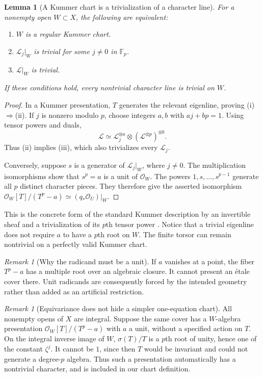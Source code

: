 \documentclass[11pt,a4paper]{article}
\newtheorem{lemma}[theorem]{Lemma}
\theoremstyle{definition}
\theoremstyle{remark}
\newtheorem{remark}[theorem]{Remark}
\newcommand{\F}{\mathbb F}
\newcommand{\OO}{\mathcal O}
\newcommand{\LL}{\mathcal L}
\begin{document}
\begin{lemma}[A Kummer chart is a trivialization of a character line]
\label{ka:lem:kummer}
For a nonempty open $W\subset X$, the following are equivalent:
\begin{enumerate}[label=(\roman*)]
\item $W$ is a regular Kummer chart.
\item $\LL_j|_W$ is trivial for some $j\neq0$ in $\F_p$.
\item $\LL|_W$ is trivial.
\end{enumerate}
If these conditions hold, every nontrivial character line is trivial on
$W$.
\end{lemma}
\begin{proof}
In a Kummer presentation, $T$ generates the relevant eigenline, proving
(i)$\Rightarrow$(ii). If $j$ is nonzero modulo $p$, choose integers $a,b$
with $aj+bp=1$. Using tensor powers and duals,
\[
 \LL\simeq\LL_j^{\otimes a}\otimes
                    (\LL^{\otimes p})^{\otimes b}.
\]
Thus (ii) implies (iii), which also trivializes every $\LL_j$.

Conversely, suppose $s$ is a generator of $\LL_j|_W$, where $j\neq0$.
The multiplication isomorphisms show that $s^p=a$ is a unit of
$\OO_W$. The powers $1,s,\ldots,s^{p-1}$ generate all $p$ distinct
character pieces. They therefore give the asserted isomorphism
$\OO_W[T]/(T^p-a)\simeq(q_*\OO_U)|_W$.
\end{proof}

This is the concrete form of the standard Kummer description by an
invertible sheaf and a trivialization of its $p$th tensor power
\cite{StacksKummer}. Notice that a trivial eigenline does not require
$a$ to have a $p$th root on $W$. The finite torsor can remain nontrivial
on a perfectly valid Kummer chart.

\begin{remark}[Why the radicand must be a unit]
If $a$ vanishes at a point, the fiber $T^p-a$ has a multiple root over an
algebraic closure. It cannot present an \'etale cover there. Unit
radicands are consequently forced by the intended geometry rather than
added as an artificial restriction.
\end{remark}

\begin{remark}[Equivariance does not hide a simpler one-equation chart]
All nonempty opens of $X$ are integral. Suppose the same cover has a
$W$-algebra presentation $\OO_W[T]/(T^p-a)$ with $a$ a unit, without a
specified action on $T$. On the integral inverse image of $W$,
$\sigma(T)/T$ is a $p$th root of unity, hence one of the constant
$\zeta^j$. It cannot be $1$, since then $T$ would be invariant and could
not generate a degree-$p$ algebra. Thus such a presentation automatically
has a nontrivial character, and is included in our chart definition.
\end{remark}
\end{document}
